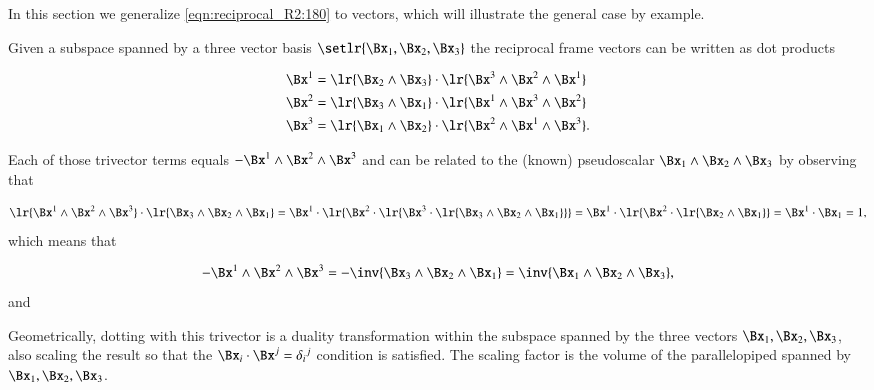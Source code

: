 %
%

In this section we generalize \cref{eqn:reciprocal_R2:180} to  vectors, which will illustrate the general case by example.

Given
a subspace spanned by a three vector basis \( \setlr{ \Bx_1, \Bx_2, \Bx_3 } \) the reciprocal frame vectors can be written as dot products

\begin{dmath}\label{eqn:reciprocal_R3:320}
\begin{aligned}
\Bx^1 &= \lr{ \Bx_2 \wedge \Bx_3 } \cdot \lr{ \Bx^3 \wedge \Bx^2 \wedge \Bx^1 } \\
\Bx^2 &= \lr{ \Bx_3 \wedge \Bx_1 } \cdot \lr{ \Bx^1 \wedge \Bx^3 \wedge \Bx^2 } \\
\Bx^3 &= \lr{ \Bx_1 \wedge \Bx_2 } \cdot \lr{ \Bx^2 \wedge \Bx^1 \wedge \Bx^3 }.
\end{aligned}
\end{dmath}

Each of those trivector terms equals \( - \Bx^1 \wedge \Bx^2 \wedge \Bx^3 \) and can be related to the (known) pseudoscalar \( \Bx_1 \wedge \Bx_2 \wedge \Bx_3 \) by observing that

\begin{dmath}\label{eqn:reciprocal_R3:340}
\lr{ \Bx^1 \wedge \Bx^2 \wedge \Bx^3 } \cdot \lr{ \Bx_3 \wedge \Bx_2 \wedge \Bx_1 }
=
\Bx^1 \cdot \lr{ \Bx^2 \cdot \lr{ \Bx^3 \cdot \lr{ \Bx_3 \wedge \Bx_2 \wedge \Bx_1 } }}
=
\Bx^1 \cdot \lr{ \Bx^2 \cdot \lr{ \Bx_2 \wedge \Bx_1 } }
=
\Bx^1 \cdot \Bx_1
=
1,
\end{dmath}
which means that

\begin{dmath}\label{eqn:reciprocal_R3:360}
-\Bx^1 \wedge \Bx^2 \wedge \Bx^3
= -\inv{ \Bx_3 \wedge \Bx_2 \wedge \Bx_1 }
= \inv{ \Bx_1 \wedge \Bx_2 \wedge \Bx_3 },
\end{dmath}
and


Geometrically, dotting with this trivector is a duality transformation within the subspace spanned by the three vectors \( \Bx_1, \Bx_2, \Bx_3 \), also scaling the result so that the \( \Bx_i \cdot \Bx^j = {\delta_i}^j \) condition is satisfied.  The scaling factor is the volume of the parallelopiped spanned by \( \Bx_1, \Bx_2, \Bx_3 \).

